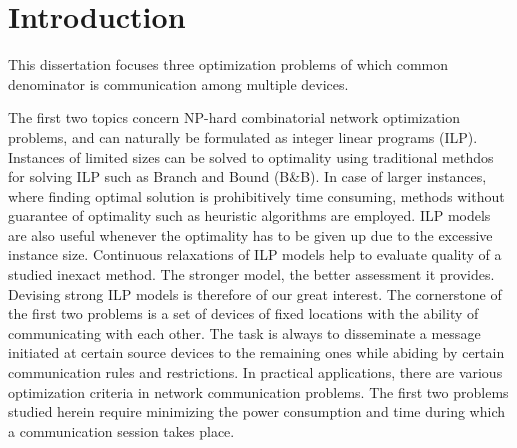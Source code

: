 
%
%
\newtheorem{theorem}{\textbf{Theorem}}
\newtheorem{problem}[theorem]{\textbf{Problem}}
\newtheorem{remark}[theorem]{\textbf{Remark}}


\chapter{Introduction}
%
This dissertation focuses three optimization problems of which common denominator is communication among multiple devices.

The first two topics concern NP-hard combinatorial network optimization problems, and can naturally be formulated as integer linear programs (ILP).
Instances of limited sizes can be solved to optimality using traditional methdos for solving ILP such as Branch and Bound (B\&B).
In case of larger instances, where finding optimal solution is prohibitively time consuming, methods without guarantee of optimality such as heuristic algorithms are employed.
ILP models are also useful whenever the optimality has to be given up due to the excessive instance size.
Continuous relaxations of ILP models help to evaluate quality of a studied inexact method.
The stronger model, the better assessment it provides.
Devising strong ILP models is therefore of our great interest.
The cornerstone of the first two problems is a set of devices of fixed locations with the ability of communicating with each other.
The task is always to disseminate a message initiated at certain source devices to the remaining ones while abiding by certain communication rules and restrictions.
In practical applications, there are various optimization criteria in network communication problems.
The first two problems studied herein require minimizing the power consumption and time during which a communication session takes place.

